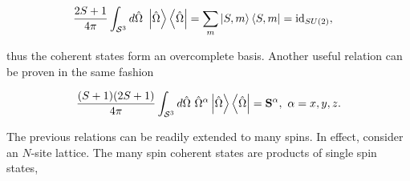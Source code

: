 \documentclass{homework}
\begin{document}
\begin{equation}
    \begin{split}
        \frac{2S+1}{4\pi} \int_{\mathcal{S}^3} d\hat{\Omega} \blanky \ket{\hat{\Omega}} \bra{\hat{\Omega}} %
        &= \sum_{m} \ket{S,m}\bra{S,m} = \textnormal{id}_{SU(2)},
    \end{split}
\end{equation}

thus the coherent states form an overcomplete basis. Another useful relation can be proven in the same fashion 

\begin{equation}
    \frac{(S+1)(2S+1)}{4\pi} \int_{\mathcal{S}^3} d\hat{\Omega} \textnormal{ } {\hat{\Omega}}^\alpha \ket{\hat{\Omega}} \bra{\hat{\Omega}} = {\bf S}^{\alpha}, \textnormal{ } \alpha = x,y,z.
\end{equation}

The previous relations can be readily extended to many spins. In effect, consider an $N$-site lattice. The many spin coherent states are products of single spin states, 
\end{document}
